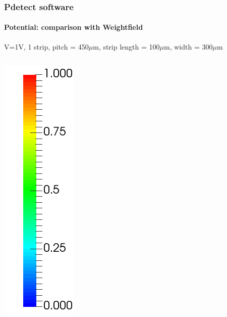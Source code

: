 \documentclass[14pt]{beamer}
\begin{document}
\begin{frame}
  \frametitle{Pdetect software}
  \framesubtitle{Potential: comparison with Weightfield}

  \fontsize{10pt}{7.2}\selectfont

  V=1V, 1 strip, pitch = 450$\mu$m, strip length = 100$\mu$m, width = 300$\mu$m

  \begin{columns}

      \begin{column}{0.1\textwidth}
        \includegraphics[width=\textwidth]{images/legend_weight_pot.png}
      \end{column}


\end{columns}
\end{frame}
\end{document}
